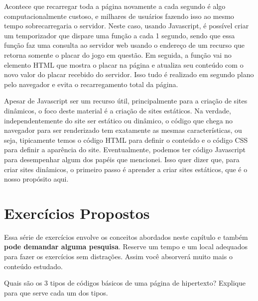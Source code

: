 Acontece que recarregar toda a página novamente a cada segundo é algo computacionalmente custoso, e milhares de usuários fazendo isso ao mesmo tempo sobrecarregaria o servidor. Neste caso, usando Javascript, é possível criar um temporizador que dispare uma função a cada 1 segundo, sendo que essa função faz uma consulta ao servidor web usando o endereço de um recurso que retorna somente o placar do jogo em questão. Em seguida, a função vai no elemento HTML que mostra o placar na página e atualiza seu conteúdo com o novo valor do placar recebido do servidor. Isso tudo é realizado em segundo plano pelo navegador e evita o recarregamento total da página.

Apesar de Javascript ser um recurso útil, principalmente para a criação de sites dinâmicos, o foco deste material é a criação de sites estáticos. Na verdade, independentemente do site ser estático ou dinâmico, o código que chega no navegador para ser renderizado tem exatamente as mesmas características, ou seja, tipicamente temos o código HTML para definir o conteúdo e o código CSS para definir a aparência do site. Eventualmente, podemos ter código Javascript para desempenhar algum dos papéis que mencionei. Isso quer dizer que, para criar sites dinâmicos, o primeiro passo é aprender a criar sites estáticos, que é o nosso propósito aqui.

\section{Exercícios Propostos}

Essa série de exercícios envolve os conceitos abordados neste capítulo e também \textbf{pode demandar alguma pesquisa}. Reserve um tempo e um local adequados para fazer os exercícios sem distrações. Assim você absorverá muito mais o conteúdo estudado.

\begin{exercise}
Quais são os 3 tipos de códigos básicos de uma página de hipertexto? Explique para que serve cada um dos tipos.
\end{exercise}

